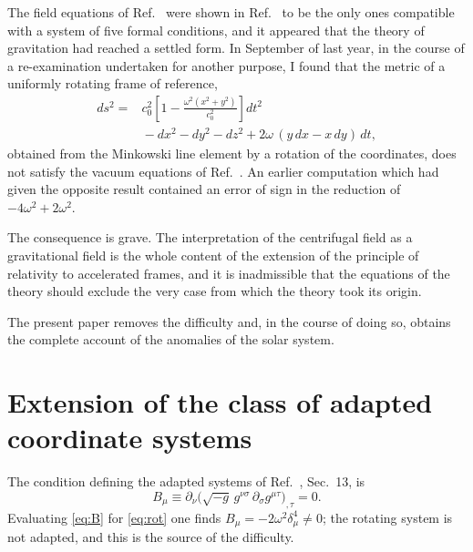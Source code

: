 \documentclass[aps,prd,reprint,amsmath,amssymb,nofootinbib,longbibliography]{revtex4-2}
\begin{document}
The field equations of Ref.~\cite{eingross1913} were shown in Ref.~\cite{paperB} to be the only ones
compatible with a system of five formal conditions, and it appeared that the theory of gravitation
had reached a settled form. In September of last year, in the course of a re-examination undertaken
for another purpose, I found that the metric of a uniformly rotating frame of reference,
\begin{equation}
\begin{split}
ds^{2} = {}& c_0^{2}\left[ 1 - \frac{\omega^{2}(x^{2}+y^{2})}{c_0^{2}} \right] dt^{2} \\
 &{} - dx^{2} - dy^{2} - dz^{2} + 2\omega\,(y\,dx - x\,dy)\,dt ,
\end{split}
\label{eq:rot}
\end{equation}
obtained from the Minkowski line element by a rotation of the coordinates, does not satisfy the
vacuum equations of Ref.~\cite{eingross1913}. An earlier computation which had given the opposite
result contained an error of sign in the reduction of $-4\omega^{2}+2\omega^{2}$.

The consequence is grave. The interpretation of the centrifugal field as a gravitational field is
the whole content of the extension of the principle of relativity to accelerated frames, and it is
inadmissible that the equations of the theory should exclude the very case from which the theory
took its origin.

The present paper removes the difficulty and, in the course of doing so, obtains the complete
account of the anomalies of the solar system.

\section{Extension of the class of adapted coordinate systems}

The condition defining the adapted systems of Ref.~\cite{ein1914}, Sec.~13, is
\begin{equation}
B_{\mu} \equiv \partial_{\nu}\big( \sqrt{-g}\, g^{\nu\sigma}\, \partial_{\sigma} g^{\mu\tau}
   \big)_{,\tau} = 0 .
\label{eq:B}
\end{equation}
Evaluating \eqref{eq:B} for \eqref{eq:rot} one finds $B_{\mu} = -2\omega^{2}\delta_{\mu}^{4} \neq 0$;
the rotating system is not adapted, and this is the source of the difficulty.
\end{document}
